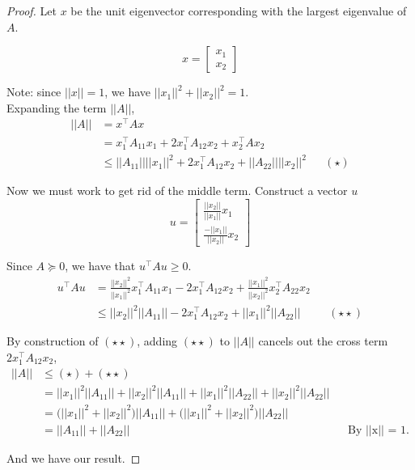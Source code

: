 \documentclass[a4paper]{article}
\begin{document}
\begin{proof}
    Let $x$ be the unit eigenvector corresponding with the largest eigenvalue of $A$.

\[
    x = \begin{bmatrix}
        x_1 \\
        x_2
        \end{bmatrix}
\]

Note: since $||x|| = 1$, we have $||x_1||^2 + ||x_2||^2 = 1$. \\

Expanding the term $||A||$,
\begin{align*}
    ||A|| &= x^\intercal A x \\
          &= x_1^\intercal A_{11} x_1 + 2 x_1^\intercal A_{12} x_2 + x_2^\intercal A x_2 \\
          &\leq ||A_{11}||||x_1||^2 + 2 x_1^\intercal A_{12} x_2 + ||A_{22}||||x_2||^2 && (\star)
\end{align*}

Now we must work to get rid of the middle term. Construct a vector $u$
\[
    u = \begin{bmatrix}
        \frac{||x_2||}{||x_1||} x_1 \\
        \frac{-||x_1||}{||x_2||} x_2
        \end{bmatrix}
\]

Since $A \succeq 0$, we have that $u^\intercal A u \geq 0$.
\begin{align*}
    u^\intercal A u &= \frac{||x_2||^2}{||x_1||^2} x_1^\intercal A_{11} x_1 - 2 x_1^\intercal A_{12} x_2 + \frac{||x_1||^2}{||x_2||^2} x_2^\intercal A_{22} x_2 \\
                    &\leq ||x_2||^2 ||A_{11}|| - 2 x_1^\intercal A_{12} x_2 + ||x_1||^2 ||A_{22}|| && (\star \star)
\end{align*}

By construction of $(\star \star)$, adding $(\star \star)$ to $||A||$ cancels out the cross term $2 x_1^\intercal A_{12} x_2$,
\begin{align*}
    ||A|| &\leq (\star) + (\star \star) \\
          &= ||x_1||^2 ||A_{11}|| + ||x_2||^2 ||A_{11}|| + ||x_1||^2 ||A_{22}|| + ||x_2||^2 ||A_{22}|| \\
          &= \big(||x_1||^2 + ||x_2||^2 \big) ||A_{11}|| + \big( ||x_1||^2 + ||x_2||^2 \big) ||A_{22}|| \\
          &= ||A_{11}|| + ||A_{22}|| && \text{By ||x|| = 1}.
\end{align*}

And we have our result.

\end{proof}
\end{document}
